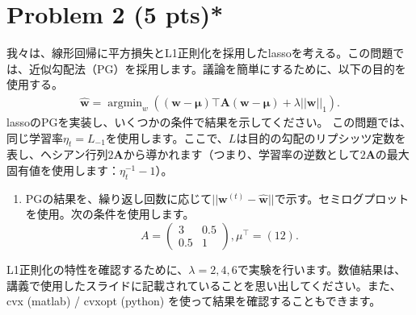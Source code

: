 \documentclass{jsarticle}
\DeclareMathOperator*{\argmin}{argmin}
\begin{document}
\section*{Problem 2 (5 pts)*}
我々は、線形回帰に平方損失とL1正則化を採用したlassoを考える。この問題では、近似勾配法（PG）を採用します。議論を簡単にするために、以下の目的を使用する。
\begin{align*}
  \hat{\bm w} = \argmin_{w} \left((\bm w-\bm\mu)\top \bm A(\bm w-\bm\mu)+\lambda||\bm w||_1\right).
\end{align*}
lassoのPGを実装し、いくつかの条件で結果を示してください。
この問題では、同じ学習率$\eta_t = L_{-1}$を使用します。ここで、$L$は目的の勾配のリプシッツ定数を表し、ヘシアン行列$2\bm A$から導かれます（つまり、学習率の逆数として$2\bm A$の最大固有値を使用します：$\eta_t^{-1}-1$）。
\begin{enumerate}
  \item PGの結果を、繰り返し回数に応じて$||\bm w^{(t)} − \hat{\bm w}||$で示す。セミログプロットを使用。次の条件を使用します。
  $$A=\begin{pmatrix}
  3& 0.5 \\
  0.5& 1
  \end{pmatrix}, \mu^\top=(1 2).$$
\end{enumerate}
L1正則化の特性を確認するために、$\lambda = 2, 4, 6$で実験を行います。数値結果は、講義で使用したスライドに記載されていることを思い出してください。また、cvx (matlab) / cvxopt (python) を使って結果を確認することもできます。
\end{document}

